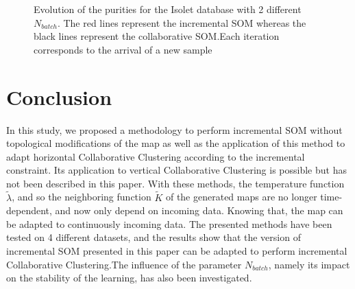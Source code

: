 \begin{figure}[!h]
					\caption{Evolution of the purities for the Isolet database with 2 different $N_{batch}$. The red lines represent the incremental SOM whereas the black lines represent the collaborative SOM.\@ Each iteration corresponds to the arrival of a new sample}
				\end{figure}

	\section{Conclusion}
\label{conclusion}
	In this study, we proposed a methodology to perform incremental SOM without topological modifications of the map as well as the application of this method to adapt horizontal Collaborative Clustering according to the incremental constraint. Its application to vertical Collaborative Clustering is possible but has not been described in this paper. With these methods, the temperature function $\widetilde{\lambda}$, and so the neighboring function $\widetilde{K}$ of the generated maps are no longer time-dependent, and now only depend on incoming data. Knowing that, the map can be adapted to continuously incoming data. The presented methods have been tested on 4 different datasets, and the results show that the version of incremental SOM presented in this paper can be adapted to perform incremental Collaborative Clustering.\@ The influence of the parameter $N_{batch}$, namely its impact on the stability of the learning, has also been investigated.
	
